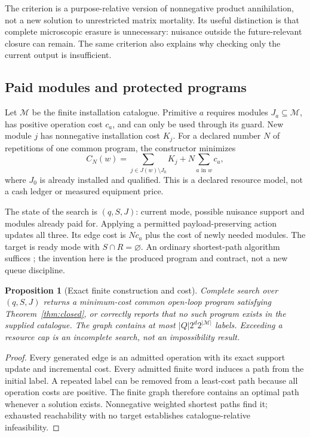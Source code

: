 \documentclass[11pt,letterpaper]{article}
\newtheorem{proposition}[theorem]{Proposition}
\theoremstyle{definition}\newtheorem{definition}[theorem]{Definition}
\theoremstyle{remark}\newtheorem{remark}[theorem]{Remark}
\begin{document}
The criterion is a purpose-relative version of nonnegative product annihilation, not a new solution to unrestricted matrix mortality. Its useful distinction is that complete microscopic erasure is unnecessary: nuisance outside the future-relevant closure can remain. The same criterion also explains why checking only the current output is insufficient.

\subsection{Paid modules and protected programs}
Let $\mathcal M$ be the finite installation catalogue. Primitive $a$ requires modules $J_a\subseteq\mathcal M$, has positive operation cost $c_a$, and can only be used through its guard. New module $j$ has nonnegative installation cost $K_j$. For a declared number $N$ of repetitions of one common program, the constructor minimizes
\begin{equation}
 C_N(w)=\sum_{j\in J(w)\setminus J_0}K_j+
 N\sum_{a\text{ in }w}c_a,
 \label{eq:resourcecost}
\end{equation}
where $J_0$ is already installed and qualified. This is a declared resource model, not a cash ledger or measured equipment price.

The state of the search is $(q,S,J)$: current mode, possible nuisance support and modules already paid for. Applying a permitted payload-preserving action updates all three. Its edge cost is $Nc_a$ plus the cost of newly needed modules. The target is ready mode with $S\cap R=\varnothing$. An ordinary shortest-path algorithm suffices \cite{dijkstra}; the invention here is the produced program and contract, not a new queue discipline.

\begin{proposition}[Exact finite construction and cost]
\label{prop:compiler}
Complete search over $(q,S,J)$ returns a minimum-cost common open-loop program satisfying Theorem~\ref{thm:closed}, or correctly reports that no such program exists in the supplied catalogue. The graph contains at most $|Q|2^d2^{|\mathcal M|}$ labels. Exceeding a resource cap is an incomplete search, not an impossibility result.
\end{proposition}
\begin{proof}
Every generated edge is an admitted operation with its exact support update and incremental cost. Every admitted finite word induces a path from the initial label. A repeated label can be removed from a least-cost path because all operation costs are positive. The finite graph therefore contains an optimal path whenever a solution exists. Nonnegative weighted shortest paths find it; exhausted reachability with no target establishes catalogue-relative infeasibility.
\end{proof}
\end{document}
